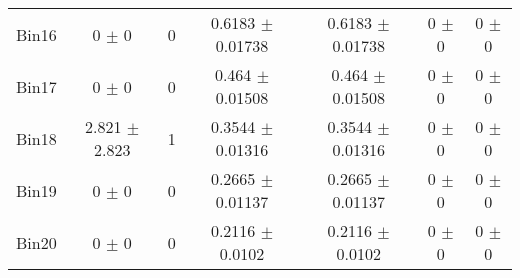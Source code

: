 \begin{tabular}{@{\extracolsep{4pt}}lcccccc@{}}
     Bin16 & 0 $\pm$ 0 & 0 & 0.6183 $\pm$ 0.01738 & 0.6183 $\pm$ 0.01738 & 0 $\pm$ 0 & 0 $\pm$ 0 \\ 
     Bin17 & 0 $\pm$ 0 & 0 & 0.464 $\pm$ 0.01508 & 0.464 $\pm$ 0.01508 & 0 $\pm$ 0 & 0 $\pm$ 0 \\ 
     Bin18 & 2.821 $\pm$ 2.823 & 1 & 0.3544 $\pm$ 0.01316 & 0.3544 $\pm$ 0.01316 & 0 $\pm$ 0 & 0 $\pm$ 0 \\ 
     Bin19 & 0 $\pm$ 0 & 0 & 0.2665 $\pm$ 0.01137 & 0.2665 $\pm$ 0.01137 & 0 $\pm$ 0 & 0 $\pm$ 0 \\ 
     Bin20 & 0 $\pm$ 0 & 0 & 0.2116 $\pm$ 0.0102 & 0.2116 $\pm$ 0.0102 & 0 $\pm$ 0 & 0 $\pm$ 0 \\ 
\hline\hline
  \end{tabular}
